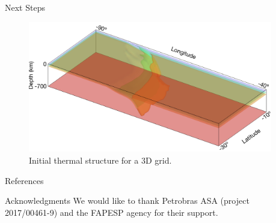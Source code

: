 \documentclass[final]{beamer}
\newlength{\sepwidth}
\newlength{\colwidth}
\newcommand{\separatorcolumn}{\begin{column}{\sepwidth}\end{column}}
\begin{document}
\begin{frame}[t]
\begin{columns}[t]
\begin{column}{\colwidth}
  \begin{block}{Next Steps}

  	\begin{figure}
    	\centering
    	\includegraphics[width=0.15\paperwidth]{figures/next-step.png}
    	\caption{Initial thermal structure for a 3D grid.}
    	\label{fig:result4}
  	\end{figure}
  \end{block}

  \begin{block}{References}
    \nocite{*}
    \footnotesize{}

  \end{block}
  
  \begin{block}{Acknowledgments}
  We would like to thank Petrobras ASA (project 2017/00461-9) and the FAPESP agency for their support.
  \end{block}

\end{column}

\separatorcolumn
\end{columns}

\end{frame}
\end{document}
